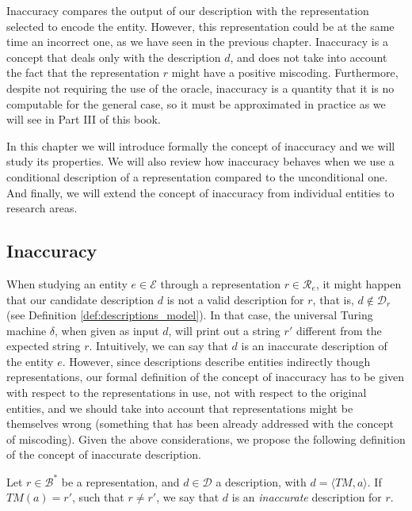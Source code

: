 Inaccuracy compares the output of our description with the representation selected to encode the entity. However, this representation could be at the same time an incorrect one, as we have seen in the previous chapter. Inaccuracy is a concept that deals only with the description $d$, and does not take into account the fact that the representation $r$ might have a positive miscoding. Furthermore, despite not requiring the use of the oracle, inaccuracy is a quantity that it is no computable for the general case, so it must be approximated in practice as we will see in Part III of this book.

In this chapter we will introduce formally the concept of inaccuracy and we will study its properties. We will also review how inaccuracy behaves when we use a conditional description of a representation compared to the unconditional one. And finally, we will extend the concept of inaccuracy from individual entities to research areas.

%
%

\subsection{Inaccuracy}
\label{sec:inaccuracy:inaccuracy}

When studying an entity $e \in \mathcal{E}$ through a representation $r \in \mathcal{R}_e$, it might happen that our candidate description $d$ is not a valid description for $r$, that is, $d \notin \mathcal{D}_r$ (see Definition \ref{def:descriptions_model}). In that case, the universal Turing machine $\delta$, when given as input $d$, will print out a string $r'$ different from the expected string $r$. Intuitively, we can say that $d$ is an inaccurate description of the entity $e$. However, since descriptions describe entities indirectly though representations, our formal definition of the concept of inaccuracy has to be given with respect to the representations in use, not with respect to the original entities, and we should take into account that representations might be themselves wrong (something that has been already addressed with the concept of miscoding). Given the above considerations, we propose the following definition of the concept of inaccurate description.

\begin{definition}
Let $r \in \mathcal{B}^\ast$ be a representation, and $d \in \mathcal{D}$ a description, with $ d = \langle TM, a \rangle$. If $TM(a) = r'$, such that $r \neq r'$, we say that $d$ is an \emph{inaccurate} description for $r$.
\end{definition}

